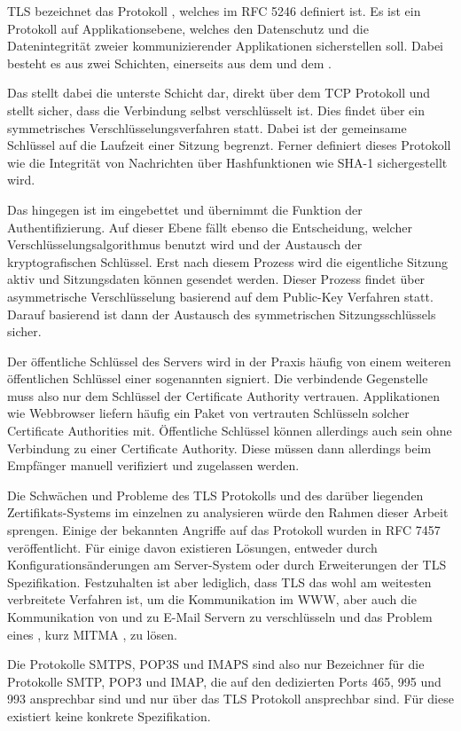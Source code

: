 TLS bezeichnet das Protokoll , welches im RFC 5246  definiert ist. Es ist ein Protokoll auf Applikationsebene, welches den Datenschutz und die Datenintegrität zweier kommunizierender Applikationen sicherstellen soll. Dabei besteht es aus zwei Schichten, einerseits aus dem  und dem . 

Das  stellt dabei die unterste Schicht dar, direkt über dem TCP Protokoll und stellt sicher, dass die Verbindung selbst verschlüsselt ist. Dies findet über ein symmetrisches Verschlüsselungsverfahren statt. Dabei ist der gemeinsame Schlüssel auf die Laufzeit einer Sitzung begrenzt. Ferner definiert dieses Protokoll wie die Integrität von Nachrichten über Hashfunktionen wie SHA-1 sichergestellt wird. 

Das  hingegen ist im  eingebettet und übernimmt die Funktion der Authentifizierung. Auf dieser Ebene fällt ebenso die Entscheidung, welcher Verschlüsselungsalgorithmus benutzt wird und der Austausch der kryptografischen Schlüssel. Erst nach diesem Prozess wird die eigentliche Sitzung aktiv und Sitzungsdaten können gesendet werden. Dieser Prozess findet über asymmetrische Verschlüsselung basierend auf dem Public-Key Verfahren statt. Darauf basierend ist dann der Austausch des symmetrischen Sitzungsschlüssels sicher. 

Der öffentliche Schlüssel des Servers wird in der Praxis häufig von einem weiteren öffentlichen Schlüssel einer sogenannten  signiert. Die verbindende Gegenstelle muss also nur dem Schlüssel der Certificate Authority vertrauen. Applikationen wie Webbrowser liefern häufig ein Paket von vertrauten Schlüsseln solcher Certificate Authorities mit. Öffentliche Schlüssel können allerdings auch  sein ohne Verbindung zu einer Certificate Authority. Diese müssen dann allerdings beim Empfänger manuell verifiziert und zugelassen werden.

Die Schwächen und Probleme des TLS Protokolls und des darüber liegenden Zertifikats-Systems im einzelnen zu analysieren würde den Rahmen dieser Arbeit sprengen. Einige der bekannten Angriffe auf das Protokoll wurden in RFC 7457  veröffentlicht. Für einige davon existieren Lösungen, entweder durch Konfigurationsänderungen am Server-System oder durch Erweiterungen der TLS Spezifikation.
Festzuhalten ist aber lediglich, dass TLS das wohl am weitesten verbreitete Verfahren ist, um die Kommunikation im WWW, aber auch die Kommunikation von und zu E-Mail Servern zu verschlüsseln und das Problem eines , kurz MITMA , zu lösen.

Die Protokolle SMTPS, POP3S und IMAPS sind also nur Bezeichner für die Protokolle SMTP, POP3 und IMAP, die auf den dedizierten Ports 465, 995 und 993 ansprechbar sind und nur über das TLS Protokoll ansprechbar sind. Für diese existiert keine konkrete Spezifikation.

